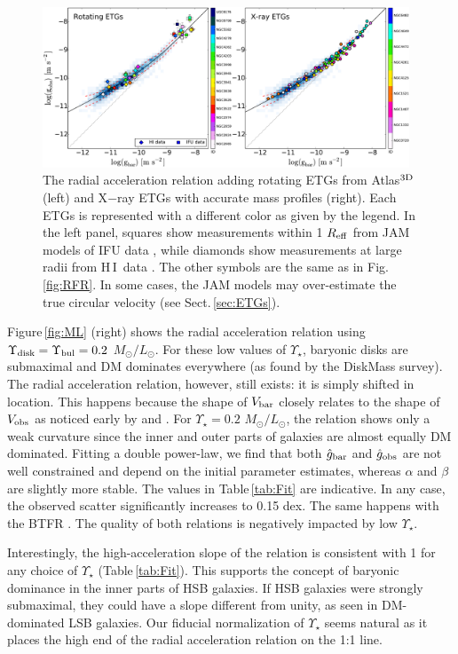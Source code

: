 \documentclass[apjl, twocolappendix]{emulateapj}
\newcommand{\hi } {{\rm H}\,{\small\rm I} \,}
\begin{document}
\begin{figure}[t]
\centering
\includegraphics[width=0.975\textwidth]{RAR_ETG.pdf}
\caption{The radial acceleration relation adding rotating ETGs from Atlas$^{\rm 3D}$ (left) and X$-$ray ETGs with accurate mass profiles (right). Each ETGs is represented with a different color as given by the legend. In the left panel, squares show measurements within 1 $R_{\rm eff}$ from JAM models of IFU data \citep{Cappellari2013}, while diamonds show measurements at large radii from \hi data \citep{denHeijer2015}. The other symbols are the same as in Fig.\,\ref{fig:RFR}. In some cases, the JAM models may over-estimate the true circular velocity (see Sect.\,\ref{sec:ETGs}).}
\label{fig:ETGs}
\end{figure}
Figure\,\ref{fig:ML} (right) shows the radial acceleration relation using $\Upsilon_{\rm disk} = \Upsilon_{\rm bul} = 0.2$ $M_{\odot}/L_{\odot}$. For these low values of $\Upsilon_{\star}$, baryonic disks are submaximal and DM dominates everywhere (as found by the DiskMass survey). The radial acceleration relation, however, still exists: it is simply shifted in location. This happens because the shape of $V_{\rm bar}$ closely relates to the shape of $V_{\rm obs}$ as noticed early by \citet{vanAlbada1986} and \citet{Kent1987}. For $\Upsilon_{\star}=0.2$ $M_{\odot}/L_{\odot}$, the relation shows only a weak curvature since the inner and outer parts of galaxies are almost equally DM dominated. Fitting a double power-law, we find that both $\hat{g}_{\rm bar}$ and $\hat{g}_{\rm obs}$ are not well constrained and depend on the initial parameter estimates, whereas $\alpha$ and $\beta$ are slightly more stable. The values in Table\,\ref{tab:Fit} are indicative. In any case, the observed scatter significantly increases to 0.15 dex. The same happens with the BTFR \citep{Lelli2016}. The quality of both relations is negatively impacted by low $\Upsilon_{\star}$.

Interestingly, the high-acceleration slope of the relation is consistent with 1 for any choice of $\Upsilon_{\star}$ (Table\,\ref{tab:Fit}). This supports the concept of baryonic dominance in the inner parts of HSB galaxies. If HSB galaxies were strongly submaximal, they could have a slope different from unity, as seen in DM-dominated LSB galaxies. Our fiducial normalization of $\Upsilon_{\star}$ seems natural as it places the high end of the radial acceleration relation on the 1:1 line.
\end{document}
